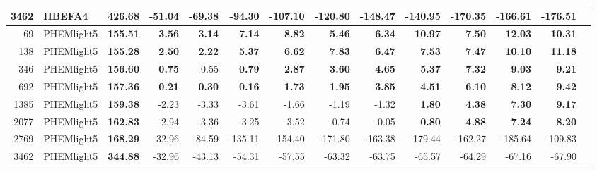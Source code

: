 \begin{table}[htb]
{\begin{tabular}{r l *{12}{r}}
      3462 & HBEFA4      & \textbf{426.68}       & -51.04 & -69.38 & -94.30  & -107.10 & -120.80 & -148.47 & -140.95 & -170.35 & -166.61 & -176.51 \\
      \midrule
      69   & PHEMlight5 & \textbf{155.51}       & \textbf{3.56}  & \textbf{3.14}  & \textbf{7.14}  & \textbf{8.82}  & \textbf{5.46}  & \textbf{6.34}  & \textbf{10.97} & \textbf{7.50}  & \textbf{12.03} & \textbf{10.31} \\
      138  & PHEMlight5 & \textbf{155.28}       & \textbf{2.50}  & \textbf{2.22}  & \textbf{5.37}  & \textbf{6.62}  & \textbf{7.83}  & \textbf{6.47}  & \textbf{7.53}  & \textbf{7.47}  & \textbf{10.10} & \textbf{11.18} \\
      346  & PHEMlight5 & \textbf{156.60}       & \textbf{0.75}  & -0.55 & \textbf{0.79}  & \textbf{2.87}  & \textbf{3.60}  & \textbf{4.65}  & \textbf{5.37}  & \textbf{7.32}  & \textbf{9.03}  & \textbf{9.21}  \\
      692  & PHEMlight5 & \textbf{157.36}       & \textbf{0.21}  & \textbf{0.30}  & \textbf{0.16}  & \textbf{1.73}  & \textbf{1.95}  & \textbf{3.85}  & \textbf{4.51}  & \textbf{6.10}  & \textbf{8.12}  & \textbf{9.42}  \\
      1385 & PHEMlight5 & \textbf{159.38}       & -2.23 & -3.33 & -3.61 & -1.66 & -1.19 & -1.32 & \textbf{1.80}  & \textbf{4.38}  & \textbf{7.30}  & \textbf{9.17}  \\
      2077 & PHEMlight5 & \textbf{162.83}       & -2.94 & -3.36 & -3.25 & -3.52 & -0.74 & -0.05 & \textbf{0.80}  & \textbf{4.88}  & \textbf{7.24}  & \textbf{8.20}  \\
      2769 & PHEMlight5 & \textbf{168.29}       & -32.96 & -84.59 & -135.11 & -154.40 & -171.80 & -163.38 & -179.44 & -162.27 & -185.64 & -109.83 \\
      3462 & PHEMlight5 & \textbf{344.88}       & -32.96 & -43.13 & -54.31 & -57.55 & -63.32 & -63.75 & -65.57 & -64.29 & -67.16 & -67.90 \\
      \bottomrule
    \end{tabular}%
  }
\end{table}
